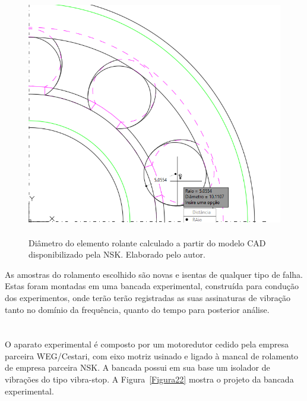 \documentclass[
	12pt,				
	oneside,			
	a4paper,			
	english,			
	brazil,			
	]{abntex2ppgsi}
\begin{document}
\begin{figure}[H]
\centering
\caption {Diâmetro do elemento rolante calculado a partir do modelo CAD disponibilizado pela NSK. Elaborado pelo autor.}
\includegraphics[width=\textwidth,height=100mm,keepaspectratio]{diametro_rolamento}
\label{diametro_rolamento}
\end{figure} 

As amostras do rolamento escolhido são novas e isentas de qualquer tipo de falha. Estas foram montadas em uma bancada experimental, construída para condução dos experimentos, onde terão terão registradas as suas assinaturas de vibração tanto no domínio da frequência, quanto do tempo para posterior análise. 


\section{}

O aparato experimental é composto por um motoredutor cedido pela empresa parceira WEG/Cestari, com eixo motriz usinado e ligado à mancal de rolamento de empresa parceira NSK. A bancada possui em sua base um isolador de vibrações do tipo vibra-stop. A Figura~\ref{Figura22} mostra o projeto da bancada experimental. 
\end{document}
